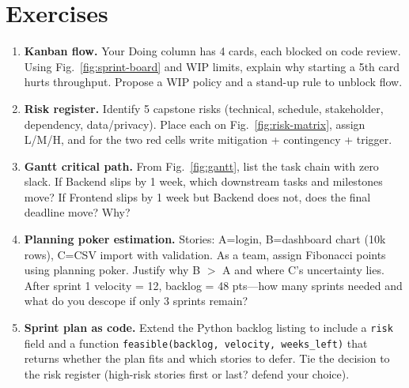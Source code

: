 \section{Exercises}
\label{sec:ch04-exercises}
\begin{enumerate}[label=E4.\arabic*, leftmargin=*, itemsep=0.8em]
    \item \textbf{Kanban flow.} Your Doing column has 4 cards, each blocked on code review. Using Fig.~\ref{fig:sprint-board} and WIP limits, explain why starting a 5th card hurts throughput. Propose a WIP policy and a stand-up rule to unblock flow.
    \item \textbf{Risk register.} Identify 5 capstone risks (technical, schedule, stakeholder, dependency, data/privacy). Place each on Fig.~\ref{fig:risk-matrix}, assign L/M/H, and for the two red cells write mitigation + contingency + trigger.
    \item \textbf{Gantt critical path.} From Fig.~\ref{fig:gantt}, list the task chain with zero slack. If Backend slips by 1 week, which downstream tasks and milestones move? If Frontend slips by 1 week but Backend does not, does the final deadline move? Why?
    \item \textbf{Planning poker estimation.} Stories: A=login, B=dashboard chart (10k rows), C=CSV import with validation. As a team, assign Fibonacci points using planning poker. Justify why B $>$ A and where C's uncertainty lies. After sprint 1 velocity = 12, backlog = 48 pts---how many sprints needed and what do you descope if only 3 sprints remain?
    \item \textbf{Sprint plan as code.} Extend the Python backlog listing to include a \texttt{risk} field and a function \texttt{feasible(backlog, velocity, weeks\_left)} that returns whether the plan fits and which stories to defer. Tie the decision to the risk register (high-risk stories first or last? defend your choice).
\end{enumerate}
